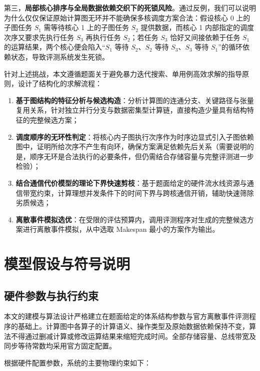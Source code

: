 \documentclass[anonymous,withtoc]{gmcm2026}
\providecommand{\tightlist}{\setlength{\itemsep}{0pt}\setlength{\parskip}{0pt}}
\begin{document}
第三，\textbf{局部核心排序与全局数据依赖交织下的死锁风险}。通过反例，我们可以说明为什么仅仅保证原始计算图无环并不能确保多核调度方案合法：假设核心 0 上的子图任务 \(S_1\) 需等待核心 1 上的子图任务 \(S_2\) 提供数据，而核心 1 内部指定的调度次序又要求先执行任务 \(S_3\) 再执行任务 \(S_2\)；若任务 \(S_3\) 恰好又间接依赖于任务 \(S_1\) 的运算结果，两个核心便会陷入``\(S_1\) 等待 \(S_2\)、\(S_2\) 等待 \(S_3\)、\(S_3\) 等待 \(S_1\)''的循环依赖状态，导致评测系统发生死锁。

针对上述挑战，本文遵循题面关于避免暴力迭代搜索、单用例高效求解的指导原则，设计了结构化的求解流程：

\begin{enumerate}
\def\labelenumi{\arabic{enumi}.}
\tightlist
\item
  \textbf{基于图结构的特征分析与候选构造}：分析计算图的连通分支、关键路径与张量复用关系，针对独立并行分支与数据密集型计算链，直接构造少量具有结构特征的完整候选方案；
\item
  \textbf{调度顺序的无环性判定}：将核心内子图执行次序作为时序边显式引入子图依赖图中，证明所给次序不产生有向环，确保方案满足依赖先后关系（需要说明的是，顺序无环是合法执行的必要条件，但仍需结合存储容量与完整评测进一步检验）；
\item
  \textbf{结合通信代价模型的理论下界快速剪枝}：基于题面给定的硬件流水线资源与通信带宽约束，计算理想并发条件下的时间下界与跨核通信开销，辅助快速筛除劣质候选；
\item
  \textbf{离散事件模拟选优}：在受限的评估预算内，调用评测程序对生成的完整候选方案进行离散事件模拟，从中选取 Makespan 最小的方案作为输出。
\end{enumerate}


\section{模型假设与符号说明}

\subsection{硬件参数与执行约束}

本文的建模与算法设计严格建立在题面给定的体系结构参数与官方离散事件评测程序的基础上。计算图中各算子的计算语义、操作类型及原始数据依赖保持不变，算法不得通过删减计算或修改运算结果来缩短完成时间。全部存储容量、总线带宽及同步等待常数均采用官方固定配置\cite{ref1}。

根据硬件配置参数，系统的主要物理约束如下：
\end{document}
